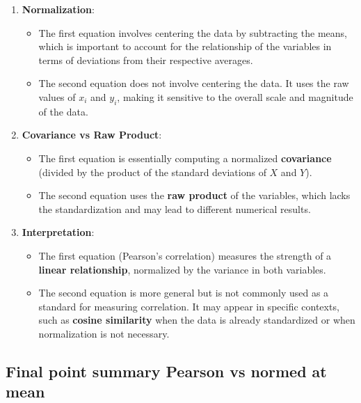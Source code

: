 \documentclass[
  12 pt,
  a4paper,
]{book}
\providecommand{\tightlist}{%
  \setlength{\itemsep}{0pt}\setlength{\parskip}{0pt}}
\numberwithin{equation}{section}
\theoremstyle{plain}      %
\theoremstyle{definition} %
\theoremstyle{remark}     %
\theoremstyle{note}         %
\begin{document}
\begin{enumerate}
\def\labelenumi{\arabic{enumi}.}
\tightlist
\item
  \textbf{Normalization}:

  \begin{itemize}
  \tightlist
  \item
    The first equation involves centering the data by subtracting the
    means, which is important to account for the relationship of the
    variables in terms of deviations from their respective averages.
  \item
    The second equation does not involve centering the data. It uses the
    raw values of \(x_i\) and \(y_i\), making it sensitive to the
    overall scale and magnitude of the data.
  \end{itemize}
\item
  \textbf{Covariance vs Raw Product}:

  \begin{itemize}
  \tightlist
  \item
    The first equation is essentially computing a normalized
    \textbf{covariance} (divided by the product of the standard
    deviations of \(X\) and \(Y\)).
  \item
    The second equation uses the \textbf{raw product} of the variables,
    which lacks the standardization and may lead to different numerical
    results.
  \end{itemize}
\item
  \textbf{Interpretation}:

  \begin{itemize}
  \tightlist
  \item
    The first equation (Pearson's correlation) measures the strength of
    a \textbf{linear relationship}, normalized by the variance in both
    variables.
  \item
    The second equation is more general but is not commonly used as a
    standard for measuring correlation. It may appear in specific
    contexts, such as \textbf{cosine similarity} when the data is
    already standardized or when normalization is not necessary.
  \end{itemize}
\end{enumerate}

\hypertarget{final-point-summary-pearson-vs-normed-at-mean}{%
\subsection{Final point summary Pearson vs normed at
mean}\label{final-point-summary-pearson-vs-normed-at-mean}}
\end{document}
